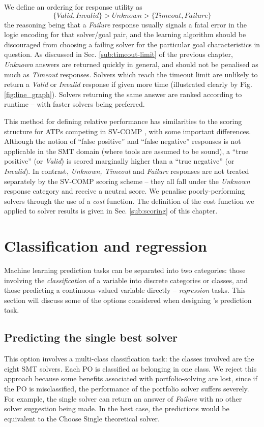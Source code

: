 We define an ordering for response utility as 
\[
\lbrace Valid, Invalid\rbrace > Unknown > \lbrace Timeout, Failure\rbrace
\]  
the reasoning being that a \textit{Failure} response usually signals a fatal error in the logic encoding for that solver/goal pair, and the learning algorithm should be discouraged from choosing a failing solver for the particular goal characteristics in question. 
As discussed in Sec. \ref{sub:timeout-limit} of the previous chapter, \textit{Unknown} answers are returned quickly in general, and should not be penalised as much as \textit{Timeout} responses. 
Solvers which reach the timeout limit are unlikely to return a \textit{Valid} or \textit{Invalid} response if given more time (illustrated clearly by Fig. \ref{fig:line_graph}).
Solvers returning the same answer are ranked according to runtime -- with faster solvers being preferred.

This method for defining relative performance has similarities to the scoring structure for ATPs competing in SV-COMP \cite{Beyer2016, SVCOMP}, with some important differences. 
Although the notion of ``false positive'' and ``false negative'' responses is not applicable in the SMT domain (where tools are assumed to be sound), a ``true positive'' (or \textit{Valid}) is scored marginally higher than a ``true negative'' (or \textit{Invalid}). 
In contrast, \textit{Unknown, Timeout} and \textit{Failure} responses are not treated separately by the SV-COMP scoring scheme -- they all fall under the \textit{Unknown} response category and receive a neutral score.
We penalise poorly-performing solvers through the use of a \textit{cost} function.
The definition of the cost function we applied to solver results is given in Sec. \ref{sub:scoring} of this chapter. 

\section{Classification and regression}
\label{sec:reg-class}

Machine learning prediction tasks can be separated into two categories: those involving the \textit{classification} of a variable into discrete categories or classes, and those predicting a continuous-valued variable directly -- \textit{regression} tasks.
This section will discuss some of the options considered when designing \where's prediction task.

\subsection{Predicting the single best solver} This option involves a multi-class classification task: the classes involved are the eight SMT solvers.
Each PO is classified as belonging in one class. 
We reject this approach because some benefits associated with portfolio-solving are lost, since if the PO is misclassified, the performance of the portfolio solver suffers severely.
For example, the single solver can return an answer of \textit{Failure} with no other solver suggestion being made.
In the best case, the predictions would be equivalent to the \textsf{Choose Single} theoretical solver.

